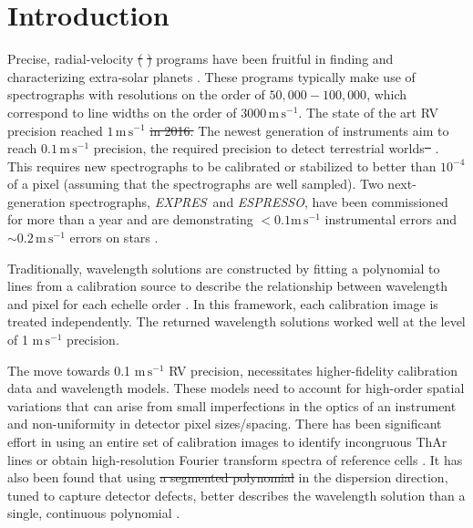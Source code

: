 \documentclass[twocolumn,table,xcolor,trackchanges]{aastex63} %
\newcommand{\project}[1]{\textsl{#1}}
\newcommand{\acronym}[1]{{\small{#1}}}
\newcommand{\expres}{\project{\acronym{EXPRES}}}
\newcommand{\espresso}{\project{\acronym{ESPRESSO}}}
\newcommand{\eprv}{\acronym{EPRV}}
\newcommand{\mps}{\mathrm{m\,s^{-1}}}
\providecommand{\DIFadd}[1]{{\protect\color{blue}\uwave{#1}}} %
\providecommand{\DIFdel}[1]{{\protect\color{red}\sout{#1}}}                      %
\providecommand{\DIFaddbegin}{} %
\providecommand{\DIFaddend}{} %
\providecommand{\DIFdelbegin}{} %
\providecommand{\DIFdelend}{} %
\begin{document}
\section{Introduction} 
Precise, radial-velocity \DIFdelbegin \DIFdel{(}%
\DIFdel{) }\DIFdelend programs have been fruitful in finding and characterizing extra-solar planets \citep[e.g.][]{mayor2011, bonfils2013, plavchan2015, butler2017}.  These programs typically make use of spectrographs with resolutions on the order of $50,000-100,000$, which correspond to line widths on the order of $3000\,\mps$.  The state of the art RV precision reached $1\, \mps$ \DIFdelbegin \DIFdel{in 2016.  }\DIFdelend \DIFaddbegin \DIFadd{by 2016 \mbox{%
\citep{fischer2016}}\hspace{0pt}%
.  }\DIFaddend The newest generation of instruments aim  to reach $0.1\,\mps$ precision, the required precision to detect terrestrial worlds\DIFdelbegin \DIFdel{\mbox{%
\citep{fischer2016}}\hspace{0pt}%
}\DIFdelend .  This requires new spectrographs to be calibrated or stabilized to better than $10^{-4}$ of a pixel (assuming that the spectrographs are well sampled).  Two next-generation spectrographs, \expres\ and \espresso, have been commissioned for more than a year and are demonstrating $<0.1 \mps$ instrumental errors and $\sim 0.2\, \mps$ errors on stars \citep{pepe2013, jurgenson2016, blackman2020, petersburg2020, brewer2020, mascareno2020}.

Traditionally, wavelength solutions are constructed by fitting a polynomial to lines from a calibration source \DIFaddbegin \DIFadd{in order }\DIFaddend to describe the relationship between wavelength and pixel for each echelle order \citep{butler1996, lovis2007, cersullo2019}.  In this framework, each calibration image is treated independently.  The returned wavelength solutions worked well at the level of 1 $\mps$ precision.

The move towards 0.1 $\mps$ RV precision, necessitates higher-fidelity calibration data and wavelength models.  These models need to account for high-order spatial variations that can arise from small imperfections in the optics of an instrument and non-uniformity in detector pixel sizes/spacing.  There has been significant effort in using an entire set of calibration images to identify incongruous ThAr lines \citep{coffinet2019} or obtain high-resolution Fourier transform spectra of reference cells \citep{wang2020}.  It has also been found that using \DIFdelbegin \DIFdel{a segmented polynomial }\DIFdelend \DIFaddbegin \DIFadd{multiple polynomials }\DIFaddend in the dispersion direction, tuned to capture detector defects, better describes the wavelength solution than a single, continuous polynomial \citep{milakovic2020}.
\end{document}
